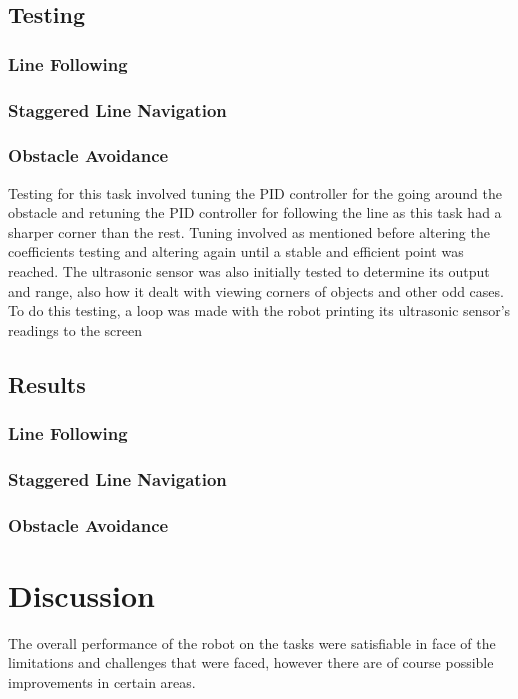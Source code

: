 \documentclass[12pt]{article}
\begin{document}
\subsection{Testing}
\subsubsection{Line Following}

\subsubsection{Staggered Line Navigation}

\subsubsection{Obstacle Avoidance}
Testing for this task involved tuning the PID controller for the going around the obstacle and retuning the PID controller for following the line as this task had a sharper corner than the rest. Tuning involved as mentioned before altering the coefficients testing and altering again until a stable and efficient point was reached. The ultrasonic sensor was also initially tested to determine its output and range, also how it dealt with viewing corners of objects and other odd cases. To do this testing, a loop was made with the robot printing its ultrasonic sensor's readings to the screen  
\subsection{Results}
\subsubsection{Line Following}
\subsubsection{Staggered Line Navigation}
\subsubsection{Obstacle Avoidance}


\section{Discussion}
The overall performance of the robot on the tasks were satisfiable in face of the limitations and challenges that were faced, however there are of course possible improvements in certain areas. 
\end{document}
